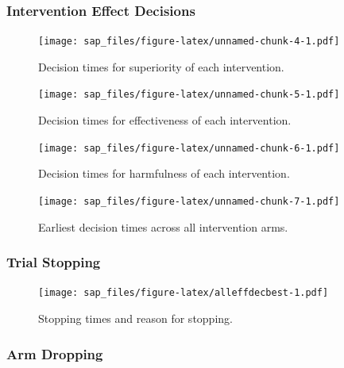 \documentclass[
  bibliography=totoc]{scrreprt}
\begin{document}
\clearpage

\hypertarget{intervention-effect-decisions}{%
\subsubsection{Intervention Effect Decisions}\label{intervention-effect-decisions}}

\begin{figure}
\centering
\texttt{[image: sap\_files/figure-latex/unnamed-chunk-4-1.pdf]}
\caption{\label{fig:unnamed-chunk-4}Decision times for superiority of each intervention.}
\end{figure}

\begin{figure}
\centering
\texttt{[image: sap\_files/figure-latex/unnamed-chunk-5-1.pdf]}
\caption{\label{fig:unnamed-chunk-5}Decision times for effectiveness of each intervention.}
\end{figure}

\begin{figure}
\centering
\texttt{[image: sap\_files/figure-latex/unnamed-chunk-6-1.pdf]}
\caption{\label{fig:unnamed-chunk-6}Decision times for harmfulness of each intervention.}
\end{figure}

\begin{figure}
\centering
\texttt{[image: sap\_files/figure-latex/unnamed-chunk-7-1.pdf]}
\caption{\label{fig:unnamed-chunk-7}Earliest decision times across all intervention arms.}
\end{figure}

\clearpage

\hypertarget{trial-stopping}{%
\subsubsection{Trial Stopping}\label{trial-stopping}}

\begin{figure}
\centering
\texttt{[image: sap\_files/figure-latex/alleffdecbest-1.pdf]}
\caption{\label{fig:alleffdecbest}Stopping times and reason for stopping.}
\end{figure}

\clearpage

\hypertarget{arm-dropping}{%
\subsubsection{Arm Dropping}\label{arm-dropping}}
\end{document}
